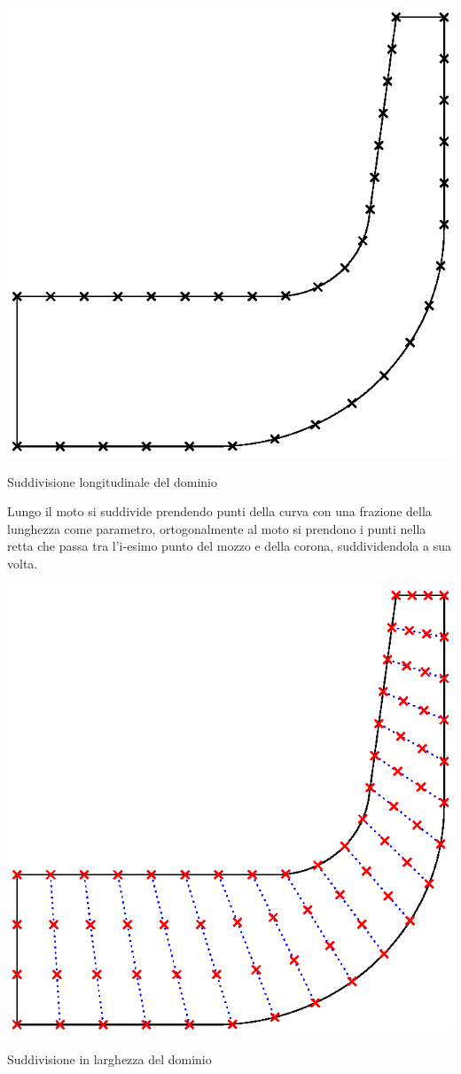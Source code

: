 \documentclass{tufte-handout}
\begin{document}
\begin{marginfigure}%
  \includegraphics[width=\linewidth]{fem/divisione_lungo_moto.eps}
  \caption{Suddivisione longitudinale del dominio}
  \label{fig:divlung}
\end{marginfigure}

Lungo il moto si suddivide prendendo punti della curva con una frazione della lunghezza come parametro, ortogonalmente al moto si prendono i punti nella retta che passa tra l'i-esimo punto del mozzo e della corona, suddividendola a sua volta.

\begin{marginfigure}%
  \includegraphics[width=\linewidth]{fem/divisione_largo_moto.eps}
  \caption{Suddivisione in larghezza del dominio}
  \label{fig:divlarg}
\end{marginfigure}
\end{document}
